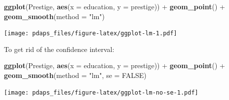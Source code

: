 \documentclass[12pt,oneside,openany]{book}
\newenvironment{Shaded}{\begin{snugshade}}{\end{snugshade}}
\newcommand{\KeywordTok}[1]{\textcolor[rgb]{0.13,0.29,0.53}{\textbf{{#1}}}}
\newcommand{\DataTypeTok}[1]{\textcolor[rgb]{0.13,0.29,0.53}{{#1}}}
\newcommand{\StringTok}[1]{\textcolor[rgb]{0.31,0.60,0.02}{{#1}}}
\newcommand{\OtherTok}[1]{\textcolor[rgb]{0.56,0.35,0.01}{{#1}}}
\newcommand{\NormalTok}[1]{{#1}}
\begin{document}
\begin{Shaded}
\begin{Highlighting}[]
\KeywordTok{ggplot}\NormalTok{(Prestige, }\KeywordTok{aes}\NormalTok{(}\DataTypeTok{x =} \NormalTok{education, }\DataTypeTok{y =} \NormalTok{prestige)) +}
\StringTok{  }\KeywordTok{geom_point}\NormalTok{() +}
\StringTok{  }\KeywordTok{geom_smooth}\NormalTok{(}\DataTypeTok{method =} \StringTok{"lm"}\NormalTok{)}
\end{Highlighting}
\end{Shaded}

\texttt{[image: pdaps\_files/figure-latex/ggplot-lm-1.pdf]}

To get rid of the confidence interval:

\begin{Shaded}
\begin{Highlighting}[]
\KeywordTok{ggplot}\NormalTok{(Prestige, }\KeywordTok{aes}\NormalTok{(}\DataTypeTok{x =} \NormalTok{education, }\DataTypeTok{y =} \NormalTok{prestige)) +}
\StringTok{  }\KeywordTok{geom_point}\NormalTok{() +}
\StringTok{  }\KeywordTok{geom_smooth}\NormalTok{(}\DataTypeTok{method =} \StringTok{"lm"}\NormalTok{, }\DataTypeTok{se =} \OtherTok{FALSE}\NormalTok{)}
\end{Highlighting}
\end{Shaded}

\texttt{[image: pdaps\_files/figure-latex/ggplot-lm-no-se-1.pdf]}


\end{document}
